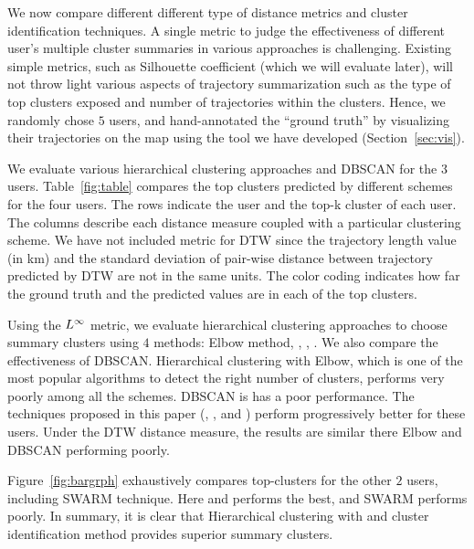 We now compare different different type of distance metrics and cluster identification techniques. 
A single metric to judge the effectiveness of different user's multiple cluster summaries in various approaches is challenging. Existing simple metrics, such as Silhouette coefficient (which we will evaluate later), will not throw light various aspects of trajectory summarization such as the type of top clusters exposed and number of trajectories within the clusters. Hence, we randomly chose $5$ users, and hand-annotated the ``ground truth'' by visualizing their trajectories on the map using the tool we have developed (Section~\ref{sec:vis}). 

We evaluate various hierarchical clustering approaches and DBSCAN for the $3$ users. Table~\ref{fig:table} compares the top clusters predicted by different schemes for the four users. The rows indicate the user and the top-k cluster of each user. The columns describe each distance measure coupled with a particular clustering scheme. We have not included \lthAware metric for DTW since the trajectory length value (in km) and the standard deviation of pair-wise distance between trajectory predicted by DTW are not in the same units. The color coding indicates how far the ground truth and the predicted values are in each of the top clusters. 

Using the $L^\infty$ metric, we evaluate hierarchical clustering approaches to choose summary clusters using $4$ methods: Elbow method, \thresh, \lthAware, \modal. We also compare the effectiveness of DBSCAN. Hierarchical clustering with Elbow, which is one of the most popular algorithms to detect the right number of clusters, performs very poorly among all the schemes. DBSCAN is has a poor performance. The techniques proposed in this paper (\thresh, \lthAware, and \modal) perform progressively better for these users. Under the DTW distance measure, the results are similar there Elbow and DBSCAN performing poorly. 

Figure~\ref{fig:bargrph} exhaustively compares top-clusters for the other $2$ users, including SWARM technique. Here \lthAware and \modal performs the best, and SWARM performs poorly. In summary, it is clear that Hierarchical clustering with \modal and \lthAware cluster identification method provides superior summary clusters.

